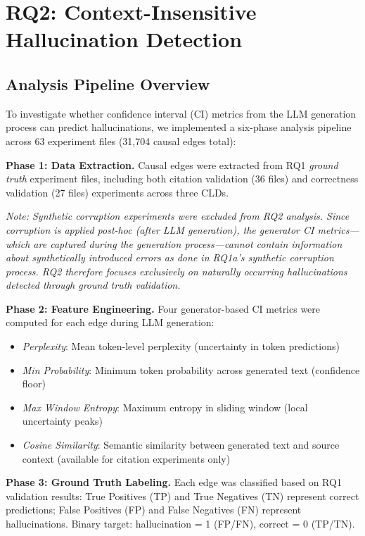 \section{RQ2: Context-Insensitive Hallucination Detection}

\subsection{Analysis Pipeline Overview}

To investigate whether confidence interval (CI) metrics from the LLM generation process can predict hallucinations, we implemented a six-phase analysis pipeline across 63 experiment files (31,704 causal edges total):

\textbf{Phase 1: Data Extraction.} Causal edges were extracted from RQ1 \textit{ground truth} experiment files, including both citation validation (36 files) and correctness validation (27 files) experiments across three CLDs. 

\textit{Note: Synthetic corruption experiments were excluded from RQ2 analysis. Since corruption is applied post-hoc (after LLM generation), the generator CI metrics---which are captured during the generation process---cannot contain information about synthetically introduced errors as done in RQ1a's synthetic corruption process. RQ2 therefore focuses exclusively on naturally occurring hallucinations detected through ground truth validation.}

\textbf{Phase 2: Feature Engineering.} Four generator-based CI metrics were computed for each edge during LLM generation:
\begin{itemize}
    \item \textit{Perplexity}: Mean token-level perplexity (uncertainty in token predictions)
    \item \textit{Min Probability}: Minimum token probability across generated text (confidence floor)
    \item \textit{Max Window Entropy}: Maximum entropy in sliding window (local uncertainty peaks)
    \item \textit{Cosine Similarity}: Semantic similarity between generated text and source context (available for citation experiments only)
\end{itemize}

\textbf{Phase 3: Ground Truth Labeling.} Each edge was classified based on RQ1 validation results: True Positives (TP) and True Negatives (TN) represent correct predictions; False Positives (FP) and False Negatives (FN) represent hallucinations. Binary target: hallucination = 1 (FP/FN), correct = 0 (TP/TN).

